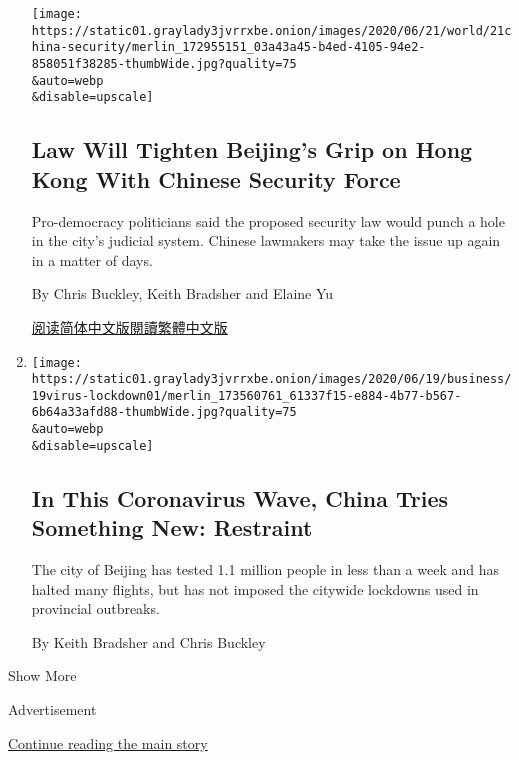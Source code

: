\begin{enumerate}
  \texttt{[image: https://static01.graylady3jvrrxbe.onion/images/2020/06/21/world/21china-security/merlin\_172955151\_03a43a45-b4ed-4105-94e2-858051f38285-thumbWide.jpg?quality=75\\\&auto=webp\\\&disable=upscale]}

  \hypertarget{law-will-tighten-beijings-grip-on-hong-kong-with-chinese-security-force}{%
  \subsection{Law Will Tighten Beijing's Grip on Hong Kong With Chinese
  Security
  Force}\label{law-will-tighten-beijings-grip-on-hong-kong-with-chinese-security-force}}

  Pro-democracy politicians said the proposed security law would punch a
  hole in the city's judicial system. Chinese lawmakers may take the
  issue up again in a matter of days.

  By Chris Buckley, Keith Bradsher and Elaine Yu

  \href{https://cn.nytimes3xbfgragh.onion/china/20200622/china-hong-kong-security-law/}{阅读简体中文版}\href{https://cn.nytimes3xbfgragh.onion/china/20200622/china-hong-kong-security-law/zh-hant/}{閱讀繁體中文版}
\item
  \href{/2020/06/19/world/asia/coronavirus-china-beijing.html}{}

  \texttt{[image: https://static01.graylady3jvrrxbe.onion/images/2020/06/19/business/19virus-lockdown01/merlin\_173560761\_61337f15-e884-4b77-b567-6b64a33afd88-thumbWide.jpg?quality=75\\\&auto=webp\\\&disable=upscale]}

  \hypertarget{in-this-coronavirus-wave-china-tries-something-new-restraint}{%
  \subsection{In This Coronavirus Wave, China Tries Something New:
  Restraint}\label{in-this-coronavirus-wave-china-tries-something-new-restraint}}

  The city of Beijing has tested 1.1 million people in less than a week
  and has halted many flights, but has not imposed the citywide
  lockdowns used in provincial outbreaks.

  By Keith Bradsher and Chris Buckley
\end{enumerate}

Show More

Advertisement

\protect\hyperlink{after-mid2}{Continue reading the main story}

